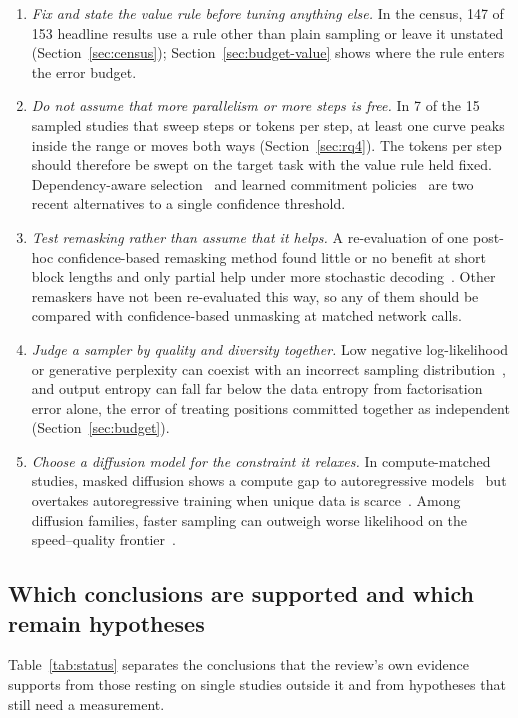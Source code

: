 \begin{enumerate}
  \item \emph{Fix and state the value rule before tuning anything else.} In the census, 147 of 153 headline results use a rule other than plain sampling or leave it unstated (Section~\ref{sec:census}); Section~\ref{sec:budget-value} shows where the rule enters the error budget.
  \item \emph{Do not assume that more parallelism or more steps is free.} In 7 of the 15 sampled studies that sweep steps or tokens per step, at least one curve peaks inside the range or moves both ways (Section~\ref{sec:rq4}). The tokens per step should therefore be swept on the target task with the value rule held fixed. Dependency-aware selection~\cite{arXiv:2604.02560} and learned commitment policies~\cite{arXiv:2605.24697} are two recent alternatives to a single confidence threshold.
  \item \emph{Test remasking rather than assume that it helps.} A re-evaluation of one post-hoc confidence-based remasking method found little or no benefit at short block lengths and only partial help under more stochastic decoding~\cite{arXiv:2606.12232}. Other remaskers have not been re-evaluated this way, so any of them should be compared with confidence-based unmasking at matched network calls.
  \item \emph{Judge a sampler by quality and diversity together.} Low negative log-likelihood or generative perplexity can coexist with an incorrect sampling distribution~\cite{arXiv:2602.19619}, and output entropy can fall far below the data entropy from factorisation error alone, the error of treating positions committed together as independent (Section~\ref{sec:budget}).
  \item \emph{Choose a diffusion model for the constraint it relaxes.} In compute-matched studies, masked diffusion shows a compute gap to autoregressive models~\cite{arXiv:2410.18514} but overtakes autoregressive training when unique data is scarce~\cite{arXiv:2507.15857,arXiv:2511.03276}. Among diffusion families, faster sampling can outweigh worse likelihood on the speed--quality frontier~\cite{arXiv:2602.15014}.
\end{enumerate}

\subsection{Which conclusions are supported and which remain hypotheses}
\label{sec:practice-status}
Table~\ref{tab:status} separates the conclusions that the review's own evidence supports from those resting on single studies outside it and from hypotheses that still need a measurement.


